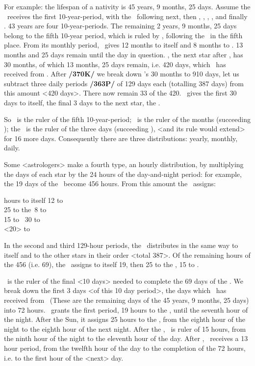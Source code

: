 For example: the lifespan of a nativity is 45 years, 9 months, 25 days. Assume the \Sun\, receives the first 10-year-period, with the \Moon\, following next, then \Mars, \Mercury, \Jupiter, \Venus, and finally \Saturn. 43 years are four 10-year-periods. The remaining 2 years, 9 months, 25 days belong to the fifth 10-year period, which is ruled by \Jupiter, following the \Sun\, in the fifth place. From its monthly period, \Jupiter\, gives 12 months to itself and 8 months to \Venus. 13 months and 25 days remain until the day in question. \Saturn, the next star after \Venus, has 30 months, of which 13 months, 25 days remain, i.e. 420 days, which \Saturn\, has received from \Jupiter. After \textbf{/370K/} we break down \Saturn’s 30 months to 910 days, let us subtract three daily periods \textbf{/363P/} of 129 days each (totalling 387 days) from this amount <420 days>. There now remain 33 of the 420. \Saturn\, gives the first 30 days to itself, the final 3 days to the next star, the \Sun. 

So \Jupiter\, is the ruler of the fifth 10-year-period; \Saturn\, is the ruler of the months (succeeding \Venus); the \Sun\, is the ruler of the three days (succeeding \Saturn), <and its rule would extend> for 16 more days. Consequently there are three distributions: yearly, monthly, daily. 

Some <astrologers> make a fourth type, an hourly distribution, by multiplying the days of each star by the 24 hours of the day-and-night period: for example, the 19 days of the \Sun\, become 456 hours. From this amount the \Sun\, assigns:

 hours to itself 12 to \Jupiter \\
25 to the\Moon\, 8 to \Venus \\
15 to \Mars\, 30 to \Saturn \\
<20> to \Mercury

In the second and third 129-hour periods, the \Sun\, distributes in the same way to itself and to the other stars in their order <total 387>. Of the remaining hours of the 456 (i.e. 69), the \Sun\, assigns to itself 19, then 25 to the \Moon, 15 to \Mars. 

\Mercury\, is the ruler of the final <10 days> needed to complete the 69 days of the \Sun. We break down the first 3 days <of this 10 day period>, the days which \Mercury\, has received from \Saturn\, (These are the remaining days of the 45 years, 9 months, 25 days) into 72 hours. \Mercury\, grants the first period, 19 hours to the \Sun, until the seventh hour of the night. After the Sun, it assigns 25 hours to the \Moon, from the eighth hour of the night to the eighth hour of the next night. After the \Moon, \Mars\, is ruler of 15 hours, from the ninth hour of the night to the eleventh hour of the day. After \Mars, \Mercury\, receives a 13 hour period, from the twelfth hour of the day to the completion of the 72 hours, i.e. to the first hour of the <next> day.

